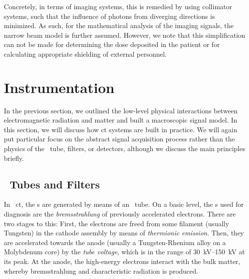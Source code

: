 \documentclass[../ml-tct.tex]{subfiles}
\begin{document}
Concretely, in terms of imaging systems, this is remedied by using collimator systems, such that the influence of photons from diverging directions is minimized.
As such, for the mathematical analysis of the imaging signals, the narrow beam model is further assumed.
However, we note that this simplification can not be made for determining the dose deposited in the patient or for calculating appropriate shielding of external personnel.
\section{Instrumentation}
In the previous section, we outlined the low-level physical interactions between electromagnetic radiation and matter and built a macroscopic signal model.
In this section, we will discuss how \gls{ct} systems are built in practice.
We will again put particular focus on the abstract signal acquisition process rather than the physics of the \xray\ tube, filters, or detectors, although we discuss the main principles briefly.
\subsection{\xray\ Tubes and Filters}
In \xray\ \gls{ct}, the \xray{}s are generated by means of an \xray\ tube.
On a basic level, the \xray{}s used for diagnosis are the \emph{bremsstrahlung} of previously accelerated electrons.
There are two stages to this:
First, the electrons are freed from some filament (usually Tungsten) in the cathode assembly by means of \emph{thermionic emission}.
Then, they are accelerated towards the anode (usually a Tungsten-Rhenium alloy on a Molybdenum core) by the \emph{tube voltage}, which is in the range of \SIrange{30}{150}{\kilo\volt} at its peak.
At the anode, the high-energy electrons interact with the bulk matter, whereby bremsstrahlung and characteristic radiation is produced.
\end{document}
